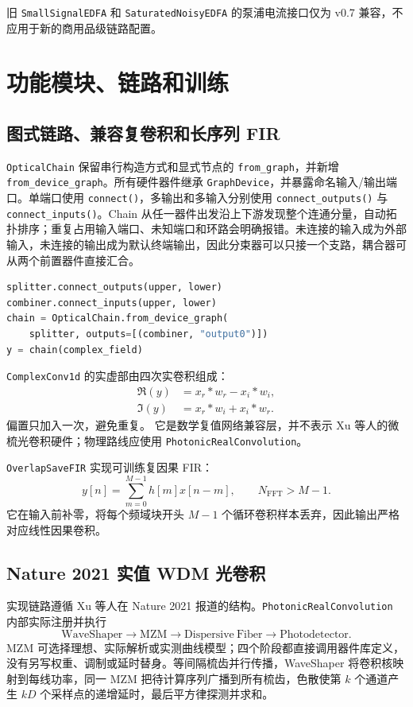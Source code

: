 \documentclass[11pt,a4paper,UTF8]{ctexart}
\newcommand{\pkg}[1]{\texttt{#1}}
\begin{document}
旧 \pkg{SmallSignalEDFA} 和 \pkg{SaturatedNoisyEDFA} 的泵浦电流接口仅为 v0.7 兼容，不应用于新的商用品级链路配置。

\section{功能模块、链路和训练}
\subsection{图式链路、兼容复卷积和长序列 FIR}
\pkg{OpticalChain} 保留串行构造方式和显式节点的 \pkg{from\_graph}，并新增 \pkg{from\_device\_graph}。所有硬件器件继承 \pkg{GraphDevice}，并暴露命名输入/输出端口。单端口使用 \pkg{connect()}，多输出和多输入分别使用 \pkg{connect\_outputs()} 与 \pkg{connect\_inputs()}。Chain 从任一器件出发沿上下游发现整个连通分量，自动拓扑排序；重复占用输入端口、未知端口和环路会明确报错。未连接的输入成为外部输入，未连接的输出成为默认终端输出，因此分束器可以只接一个支路，耦合器可从两个前置器件直接汇合。

\begin{lstlisting}[language=Python]
splitter.connect_outputs(upper, lower)
combiner.connect_inputs(upper, lower)
chain = OpticalChain.from_device_graph(
    splitter, outputs=[(combiner, "output0")])
y = chain(complex_field)
\end{lstlisting}

\pkg{ComplexConv1d} 的实虚部由四次实卷积组成：
\begin{align}
\Re(y)&=x_r*w_r-x_i*w_i,\\
\Im(y)&=x_r*w_i+x_i*w_r.
\end{align}
偏置只加入一次，避免重复。
它是数学复值网络兼容层，并不表示 Xu 等人的微梳光卷积硬件；物理路线应使用 \pkg{PhotonicRealConvolution}。

\pkg{OverlapSaveFIR} 实现可训练复因果 FIR：
\begin{equation}
y[n]=\sum_{m=0}^{M-1}h[m]x[n-m],\qquad
N_{\mathrm{FFT}}>M-1.
\end{equation}
它在输入前补零，将每个频域块开头 $M-1$ 个循环卷积样本丢弃，因此输出严格对应线性因果卷积。

\subsection{Nature 2021 实值 WDM 光卷积}
实现链路遵循 Xu 等人在 Nature 2021 报道的结构。\pkg{PhotonicRealConvolution} 内部实际注册并执行
\begin{equation*}
\mathrm{WaveShaper}\longrightarrow\mathrm{MZM}\longrightarrow
\mathrm{Dispersive\ Fiber}\longrightarrow\mathrm{Photodetector}.
\end{equation*}
MZM 可选择理想、实际解析或实测曲线模型；四个阶段都直接调用器件库定义，没有另写权重、调制或延时替身。等间隔梳齿并行传播，WaveShaper 将卷积核映射到每线功率，同一 MZM 把待计算序列广播到所有梳齿，色散使第 $k$ 个通道产生 $kD$ 个采样点的递增延时，最后平方律探测并求和。
\end{document}
